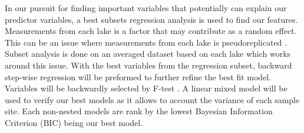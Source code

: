 In our pursuit for finding important variables that potentially can explain our predictor variables, a best subsets regression analysis is used to find our features.  Measurements from each lake is a factor that may contribute as a random effect. This can be an issue where measurements from each lake is pseudoreplicated \cite{eisenhart_assumptions_1947}. Subset analysis is done on an averaged dataset based on each lake which works around this issue.
With the best variables from the regression subset, backward step-wise regression will be preformed to further refine the best fit model. Variables will be backwardly selected by F-test \cite{kenward_method_1987}. A linear mixed model will be used to verify our best models as it allows to account the variance of each sample site. Each non-nested models are rank by the lowest Bayesian Information Criterion (BIC) being our best model.
